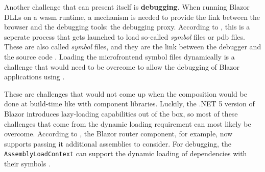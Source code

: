 Another challenge that can present itself is \textbf{debugging}. When running
Blazor DLLs on a \gls{wasm} runtime, a mechanism is needed to provide the link
between the browser and the debugging tools: the debugging proxy. According to
\textcite{Abdalla_2020}, this is a seperate process that gets launched to load
so-called \textit{symbol} files or \gls{pdb} files. These are also called
\textit{symbol} files, and they are the link between the debugger and the source
code \autocite{Microsoft_2021}. Loading the \gls{microfrontend} symbol files
dynamically is a challenge that would need to be overcome to allow the debugging
of Blazor applications using .

These are challenges that would not come up when the composition would be done
at build-time like with component libraries. Luckily, the .NET 5 version of
Blazor introduces lazy-loading capabilities out of the
box, so most of these challenges that come from the dynamic loading
requirement can most likely be overcome. According to \textcite{Kdouh_2020}, the
Blazor router component, for example, now supports passing it additional
assemblies to consider. For debugging, the \texttt{AssemblyLoadContext} can
support the dynamic loading of dependencies with their symbols
\autocite{Microsoft_2019}. 